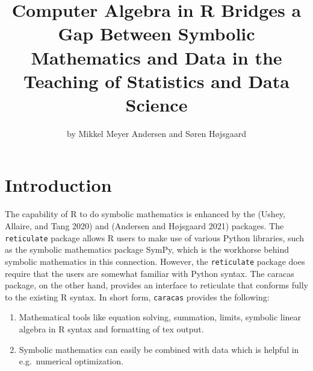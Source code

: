 \title{Computer Algebra in R Bridges a Gap Between Symbolic Mathematics and Data in the Teaching of Statistics and Data Science}


\author{by Mikkel Meyer Andersen and Søren Højsgaard}

\maketitle


\hypertarget{introduction}{%
\section{Introduction}\label{introduction}}

The capability of R to do symbolic mathematics is enhanced by the
 (Ushey, Allaire, and Tang 2020) and  (Andersen and Højsgaard 2021)
packages.
The \texttt{reticulate} package allows R users to make use of various Python
libraries, such as the symbolic mathematics package SymPy, which is
the workhorse behind symbolic mathematics in this connection.
However, the \texttt{reticulate} package does require that the users are
somewhat familiar with Python syntax. The caracas package, on the
other hand, provides an interface to reticulate that conforms fully to
the existing R syntax. In short form, \texttt{caracas} provides the
following:

\begin{enumerate}
\def\labelenumi{(\arabic{enumi})}
\item
  Mathematical tools like equation solving, summation, limits,
  symbolic linear algebra in R syntax and formatting of tex output.
\item
  Symbolic mathematics can easily be combined with data which is
  helpful in e.g.~numerical optimization.
\end{enumerate}

